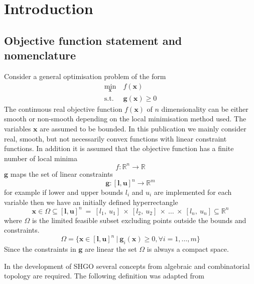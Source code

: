 \chapter{Introduction}
\section{Objective function statement and nomenclature}
Consider a general optimisation problem of the form
\begin{align} \nonumber
\underset{\mathbf{x}}{\textrm{min}} ~&f (\mathbf{x}) \\ \label{eq:gen_op}
\textrm{s.t.}~ &\mathbf{g} (\mathbf{x}) \geq 0
\end{align}
The continuous real objective function $f(\mathbf{x})$ of $n$ dimensionality can be either smooth or non-smooth depending on the local minimisation method used. The variables $\mathbf{x}$ are assumed to be bounded. In this publication we mainly consider real, smooth, but not necessarily convex functions with linear constraint functions. In addition it is assumed that the objective function has a finite number of local minima
\begin{equation} \label{eq:objfun}
f : \mathbb{R}^n \rightarrow \mathbb{R}
\end{equation}
$\mathbf{g}$ maps the set of linear constraints
\begin{equation} \label{eq:gcons}
\mathbf{g} :  [\mathbf{l}, \mathbf{u}]^n  \rightarrow \mathbb{R}^m
\end{equation}
for example if lower and upper bounds $l_i$ and $u_i$ are implemented for each variable then we have an initially defined hyperrectangle 
\begin{equation}
\mathbf{x} \in \Omega \subseteq  [\mathbf{l}, \mathbf{u}]^n~=~[l_1,~u_1]~\times~[l_2,~u_2] ~\times~\dots~\times~[l_n,~u_n] \subseteq  \mathbb{R}^n
\end{equation}
 where $\Omega$ is the limited feasible subset excluding points outside the bounds and constraints. 
\begin{equation} \label{eq:omega}
\Omega = \{ \mathbf{x} \in   [\mathbf{l}, \mathbf{u}]^n ~|~ \mathbf{g}_i (\mathbf{x} ) \geq 0, \forall i =1, \dots, m\}
\end{equation}
Since the constraints in $\mathbf{g}$ are linear the set $\Omega$ is always a compact space.

In the development of SHGO several concepts from algebraic and combinatorial topology \citep{Henle1979} are required. The following definition was adapted from \citet[p. 9]{Hatcher2011} 

